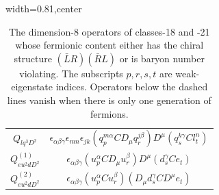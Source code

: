 \begin{table}[H]
\begin{center}
\begin{adjustbox}{width=0.81\textwidth,center}
\begin{minipage}[t]{6.7cm}
\begin{tabular}[t]{c|c}
%
$Q_{lq^3D^2}$  &  $\epsilon_{\alpha\beta\gamma} \epsilon_{mn} \epsilon_{jk} (q_p^{m\alpha} C D_\mu q_r^{j\beta}) D^\mu (q_s^{k\gamma} C l_t^n)$  \\
%
$Q_{eu^2dD^2}^{(1)}$  &  $\epsilon_{\alpha\beta\gamma} (u_p^\alpha C D_\mu u_r^\beta) D^\mu (d_s^\gamma C e_t)$  \\ \hdashline
%
$Q_{eu^2dD^2}^{(2)}$  &  $\epsilon_{\alpha\beta\gamma} (u_p^\alpha C u_r^\beta) (D_\mu d_s^\gamma C D^\mu e_t)$
\end{tabular}
\end{minipage}
\end{adjustbox}
\end{center}
\caption{The dimension-8 operators of classes-18 and -21 whose fermionic content either has the chiral structure $(\bar L R) (\bar R L)$ or is baryon number violating.
The subscripts $p, r, s, t$ are weak-eigenstate indices. 
Operators below the dashed lines vanish when there is only one generation of fermions.}
\label{tab:smeft8class_18_21}
\end{table}

